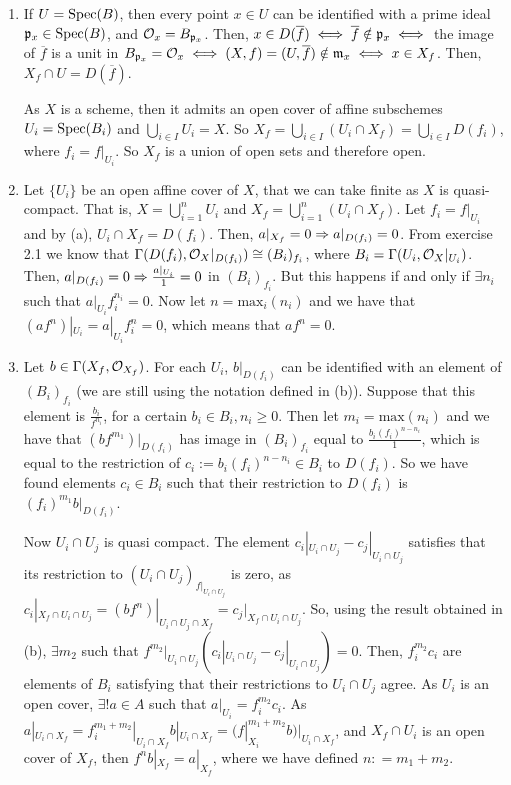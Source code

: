 \begin{sol}
	\begin{enumerate}[label=\alph*)]
		\item If $U = \mathrm{Spec}(B)$, then every point $x \in U$ can be identified with a prime ideal $\mathfrak{p}_x \in \mathrm{Spec}(B)$, and $\mathcal{O}_{x} = B_{\mathfrak{p}_x}$. Then, $x \in D(\overline{f}) \iff \overline{f} \notin \mathfrak{p}_x \iff$ the image of $\overline{f}$ is a unit in $B_{\mathfrak{p}_x} = \mathcal{O}_{x} \iff (X,f) = (U, \overline{f}) \notin \mathfrak{m}_x \iff x \in X_f$. Then, $X_f \cap U = D(\overline{f})$.

		As $X$ is a scheme, then it admits an open cover of affine subschemes $U_i = \mathrm{Spec}(B_i)$ and $\bigcup_{i \in I} U_i = X$. So $X_f = \bigcup_{i \in I} (U_i \cap X_f) = \bigcup_{i \in I} D(f_i)$, where $f_i = f|_{U_i}$. So $X_f$ is a union of open sets and therefore open.

		\item Let $\{U_i\}$ be an open affine cover of $X$, that we can take finite as $X$ is quasi-compact. That is, $X = \bigcup_{i = 1}^n U_i$ and $X_f = \bigcup_{i = 1}^n(U_i \cap X_f)$. Let $f_i = f|_{U_i}$ and by (a), $U_i \cap X_f = D(f_i)$. Then, $a|_{X_f} = 0 \Rightarrow a|_{D(f_i)} = 0$. From exercise 2.1 we know that $\Gamma(D(f_i), \mathcal{O}_X|_{D(f_i)}) \cong (B_i)_{f_i}$, where $B_i = \Gamma(U_i, \mathcal{O}_X|_{U_i})$. Then, $a|_{D(f_i)} = 0 \Rightarrow \frac{a|_{U_i}}{1} = 0$ in $(B_i)_{f_i}$. But this happens if and only if $\exists n_i$ such that $a|_{U_i}f_i^{n_i} = 0$. Now let $n = \mathrm{max}_i(n_i)$ and we have that $(af^n)|_{U_i} = a|_{U_i}f_i^{n} = 0$, which means that $af^n = 0$.

		\item Let $b \in \Gamma(X_f, \mathcal{O}_{X_f})$. For each $U_i$, $b|_{D(f_i)}$ can be identified with an element of $(B_i)_{f_i}$ (we are still using the notation defined in (b)). Suppose that this element is $\frac{b_i}{f^{n_i}}$, for a certain $b_i \in B_i, n_i \geq 0$. Then let $m_i = \mathrm{max}(n_i)$ and we have that $(bf^{m_1})|_{D(f_i)}$ has image in $(B_i)_{f_i}$ equal to $\frac{b_i (f_i)^{n-n_i}}{1}$, which is equal to the restriction of $c_i := b_i (f_i)^{n-n_i} \in B_i$ to $D(f_i)$. So we have found elements $c_i \in B_i$ such that their restriction to $D(f_i)$ is $(f_i)^{m_1}b|_{D(f_i)}$.

		Now $U_i \cap U_j$ is quasi compact. The element $c_i|_{U_i \cap U_j} - c_j|_{U_i \cap U_j}$ satisfies that its restriction to $(U_i \cap U_j)_{f|_{U_i \cap U_j}}$ is zero, as $c_i|_{X_f \cap U_i \cap U_j} = (bf^n)|_{U_i \cap U_j \cap X_f} = c_j|_{X_f \cap U_i \cap U_j}$. So, using the result obtained in (b), $\exists m_2$ such that $f^{m_2}|_{U_i \cap U_j}(c_i|_{U_i \cap U_j} - c_j|_{U_i \cap U_j}) = 0$. Then, $f_i^{m_2}c_i$ are elements of $B_i$ satisfying that their restrictions to $U_i \cap U_j$ agree. As $U_i$ is an open cover, $\exists! a \in A$ such that $a|_{U_i} = f_i^{m_2}c_i$. As $a|_{U_i \cap X_f} = f_i^{m_1 + m_2}|_{U_i \cap X_f}b|_{U_i \cap X_f} = (f|_{X_i}^{m_1+m_2}b)|_{U_i \cap X_f}$, and $X_f \cap U_i$ is an open cover of $X_f$, then $f^{n}b|_{X_f} = a|_{X_f}$, where we have defined $n: = m_1 + m_2$. 


\end{enumerate}
\end{sol}
